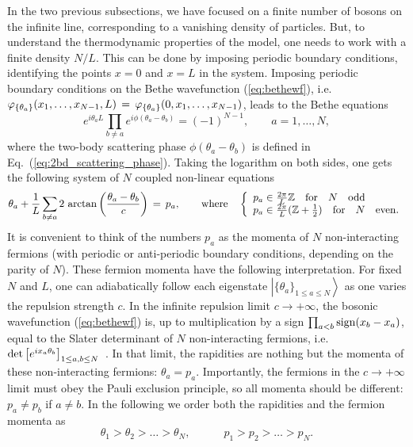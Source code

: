 \documentclass[onecolumn,amsfonts,showpacs,superscriptaddress]{revtex4-1}
\begin{document}
In the two previous subsections, we have focused on a finite number of bosons on the infinite line, corresponding to a vanishing density of particles. But, to understand the thermodynamic properties of the model, one needs to work with a finite density $N/L$. This can be done by imposing periodic boundary conditions, identifying the points $x=0$ and $x=L$ in the system. Imposing periodic boundary conditions on the Bethe wavefunction (\ref{eq:bethewf}), i.e. $\varphi_{ \{ {\bf \theta}_a \} } (x_1, \dots, x_{N-1}, L) \, = \, \varphi_{ \{ {\bf \theta}_a \} } (0, x_1, \dots, x_{N-1})$, leads to the Bethe equations 
\begin{equation}
	 e^{i \theta_a L} \prod_{b \neq a} e^{i \phi( \theta_a - \theta_b) } = (-1)^{N-1} , \qquad a=1,\dots, N,
\end{equation}
where the two-body scattering phase $\phi(\theta_a - \theta_b)$ is defined in Eq.~(\ref{eq:2bd_scattering_phase}). 
Taking the logarithm on both sides, one gets the following system of $N$ coupled non-linear equations
\begin{equation}
    \label{eq:logbethe}
	\theta_a + \frac{1}{L} \sum_{b \neq a} 2~{\rm arctan} \left( \frac{\theta_a - \theta_b}{c} \right)  \, = \, p_a ,  \qquad {\rm where} \quad \left\{ \begin{array}{l}
        p_a \in \frac{2\pi}{L} \mathbb{Z}  \quad {\rm for } \quad N \quad {\rm odd} \\	
        p_a \in \frac{2\pi}{L} (\mathbb{Z}  +\frac{1}{2}) \quad {\rm for } \quad N \quad {\rm even}.
	\end{array} \right.
\end{equation}
It is convenient to think of the numbers $p_a$ as the momenta of $N$ non-interacting fermions (with periodic or anti-periodic boundary conditions, depending on the parity of $N$). These fermion momenta have the following interpretation. For fixed $N$ and $L$, one can adiabatically follow each eigenstate $\left| \{ \theta_a\}_{1\leq a \leq N} \right>$ as one varies the repulsion strength $c$. In the infinite repulsion limit $c \rightarrow +\infty$, the bosonic wavefunction (\ref{eq:bethewf}) is, up to multiplication by a sign $\prod_{a<b }{{\rm sign}(x_b-x_a)}$, equal to the Slater determinant of $N$ non-interacting fermions, i.e. ${\rm det} \left[ e^{i x_a \theta_b} \right]_{1 \leq a,b \leq N}$~\citep{girardeau1960relationship}. In that limit, the rapidities are nothing but the momenta of these non-interacting fermions: $\theta_a = p_a$. Importantly, the fermions in the $c\rightarrow + \infty$ limit must obey the Pauli exclusion principle, so all momenta should be different: $p_a \neq p_b$ if $a\neq b$. In the following we order both the rapidities and the fermion momenta as
\begin{equation}
    \label{eq:orderrapidities}
    \theta_1 > \theta_2  > \dots > \theta_N , \qquad  \quad p_1 > p_2  > \dots > p_N .
\end{equation}
\end{document}
